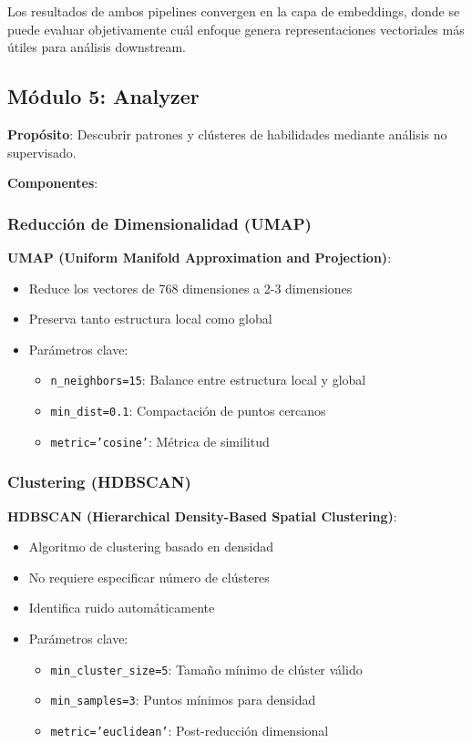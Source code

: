 Los resultados de ambos pipelines convergen en la capa de embeddings, donde se puede evaluar objetivamente cuál enfoque genera representaciones vectoriales más útiles para análisis downstream.

\subsection{Módulo 5: Analyzer}

\textbf{Propósito}: Descubrir patrones y clústeres de habilidades mediante análisis no supervisado.

\textbf{Componentes}:

\subsubsection{Reducción de Dimensionalidad (UMAP)}

\textbf{UMAP (Uniform Manifold Approximation and Projection)}:
\begin{itemize}
    \item Reduce los vectores de 768 dimensiones a 2-3 dimensiones
    \item Preserva tanto estructura local como global
    \item Parámetros clave:
    \begin{itemize}
        \item \texttt{n\_neighbors=15}: Balance entre estructura local y global
        \item \texttt{min\_dist=0.1}: Compactación de puntos cercanos
        \item \texttt{metric='cosine'}: Métrica de similitud
    \end{itemize}
\end{itemize}

\subsubsection{Clustering (HDBSCAN)}

\textbf{HDBSCAN (Hierarchical Density-Based Spatial Clustering)}:
\begin{itemize}
    \item Algoritmo de clustering basado en densidad
    \item No requiere especificar número de clústeres
    \item Identifica ruido automáticamente
    \item Parámetros clave:
    \begin{itemize}
        \item \texttt{min\_cluster\_size=5}: Tamaño mínimo de clúster válido
        \item \texttt{min\_samples=3}: Puntos mínimos para densidad
        \item \texttt{metric='euclidean'}: Post-reducción dimensional
    \end{itemize}
\end{itemize}

